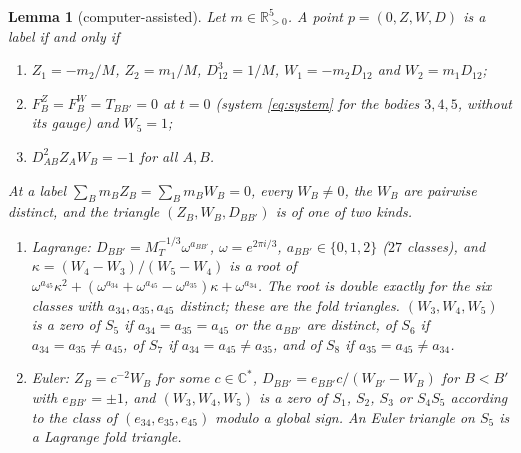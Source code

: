 \documentclass[11pt]{amsart}
\newenvironment{romanlist}{\begin{enumerate}\renewcommand{\labelenumi}{(\roman{enumi})}%
  \renewcommand{\theenumi}{\roman{enumi}}}{\end{enumerate}}
\newenvironment{alphalist}{\begin{enumerate}\renewcommand{\labelenumi}{(\alph{enumi})}%
  \renewcommand{\theenumi}{\alph{enumi}}}{\end{enumerate}}
\newtheorem{lemma}[theorem]{Lemma}
\theoremstyle{definition}
\theoremstyle{remark}
\newcommand{\C}{\mathbb{C}}
\newcommand{\Rp}{\mathbb{R}_{>0}}
\begin{document}
\begin{lemma}[computer-assisted]\label{lem:d2-fibre}
Let $m\in\Rp^5$.  A point $p=(0,Z,W,D)$ is a label if and only if
\begin{alphalist}
  \item $Z_1=-m_2/M$, $Z_2=m_1/M$, $D_{12}^3=1/M$, $W_1=-m_2D_{12}$ and $W_2=m_1D_{12}$;
  \item $F^Z_B=F^W_B=T_{BB'}=0$ at $t=0$ (system \eqref{eq:system} for the bodies $3,4,5$,
  without its gauge) and $W_5=1$;
  \item $D_{AB}^2Z_AW_B=-1$ for all $A,B$.
\end{alphalist}
At a label $\sum_Bm_BZ_B=\sum_Bm_BW_B=0$, every $W_B\ne0$, the $W_B$ are pairwise distinct, and
the \emph{triangle} $(Z_B,W_B,D_{BB'})$ is of one of two kinds.
\begin{romanlist}
  \item \emph{Lagrange:} $D_{BB'}=M_T^{-1/3}\omega^{a_{BB'}}$, $\omega=e^{2\pi i/3}$,
  $a_{BB'}\in\{0,1,2\}$ ($27$ classes), and $\kappa=(W_4-W_3)/(W_5-W_4)$ is a root of
  $\omega^{a_{45}}\kappa^2+(\omega^{a_{34}}+\omega^{a_{45}}-\omega^{a_{35}})\kappa+\omega^{a_{34}}$.
  The root is double exactly for the six classes with $a_{34},a_{35},a_{45}$ distinct; these are
  the \emph{fold} triangles.  $(W_3,W_4,W_5)$ is a zero of $S_5$ if $a_{34}=a_{35}=a_{45}$ or the
  $a_{BB'}$ are distinct, of $S_6$ if $a_{34}=a_{35}\ne a_{45}$, of $S_7$ if
  $a_{34}=a_{45}\ne a_{35}$, and of $S_8$ if $a_{35}=a_{45}\ne a_{34}$.
  \item \emph{Euler:} $Z_B=c^{-2}W_B$ for some $c\in\C^*$, $D_{BB'}=e_{BB'}c/(W_{B'}-W_B)$ for
  $B<B'$ with $e_{BB'}=\pm1$, and $(W_3,W_4,W_5)$ is a zero of $S_1$, $S_2$, $S_3$ or $S_4S_5$
  according to the class of $(e_{34},e_{35},e_{45})$ modulo a global sign.  An Euler triangle on
  $S_5$ is a Lagrange fold triangle.
\end{romanlist}
\end{lemma}
\end{document}
